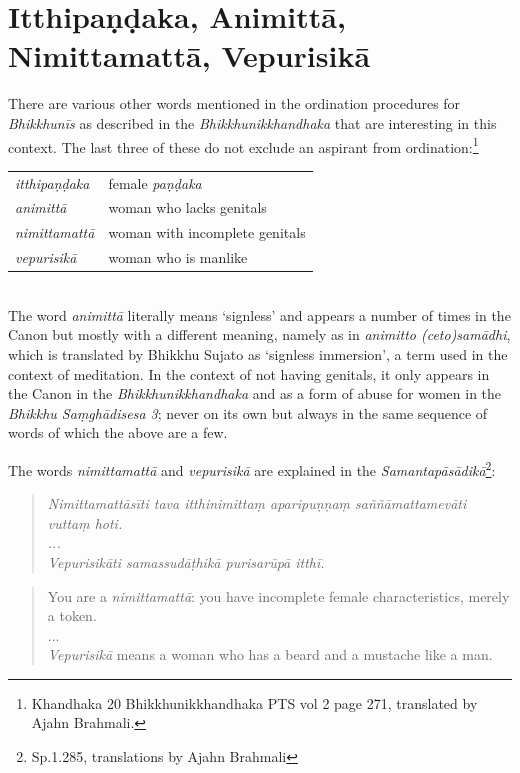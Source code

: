 \section{Itthipaṇḍaka, Animittā, Nimittamattā, Vepurisikā}

There are various other words mentioned in the ordination procedures for {\em Bhikkhunīs} as described in the {\em Bhikkhunikkhandhaka} that are interesting in this context. The last three of these do not exclude an aspirant from ordination:\footnote{Khandhaka 20 Bhikkhunikkhandhaka PTS vol 2 page 271, translated by Ajahn Brahmali.} \\

\begin{tabular}{ l l }
 {\em itthipaṇḍaka} & female {\em paṇḍaka} \\
 {\em animittā } & woman who lacks genitals \\
 {\em nimittamattā } & woman with incomplete genitals \\ 
 {\em vepurisikā } & woman who is manlike \\
\end{tabular} \\

The word {\em animittā} literally means `signless' and appears a number of times in the Canon but mostly with a different meaning, namely as in {\em animitto (ceto)samādhi}, which is translated by Bhikkhu Sujato as `signless immersion', a term used in the context of meditation. In the context of not having genitals, it only appears in the Canon in the {\em Bhikkhunikkhandhaka} and as a form of abuse for women in the {\em Bhikkhu Saṃ­ghā­di­sesa­ 3}; never on its own but always in the same sequence of words of which the above are a few.

The words {\em nimittamattā} and {\em vepurisikā} are explained in the {\em Samantapāsādikā}\footnote{Sp.1.285, translations by Ajahn Brahmali}:
\begin{quote}
{\em Nimittamattāsīti tava itthinimittaṃ aparipuṇṇaṃ saññāmattamevāti vuttaṃ hoti.\\
...\\
Vepurisikāti samassudāṭhikā purisarūpā itthī.}
\end{quote}

\begin{quote}
You are a {\em nimittamattā}: you have incomplete female characteristics, merely a token.\\
...\\
{\em Vepurisikā} means a woman who has a beard and a mustache like a man.
\end{quote}

